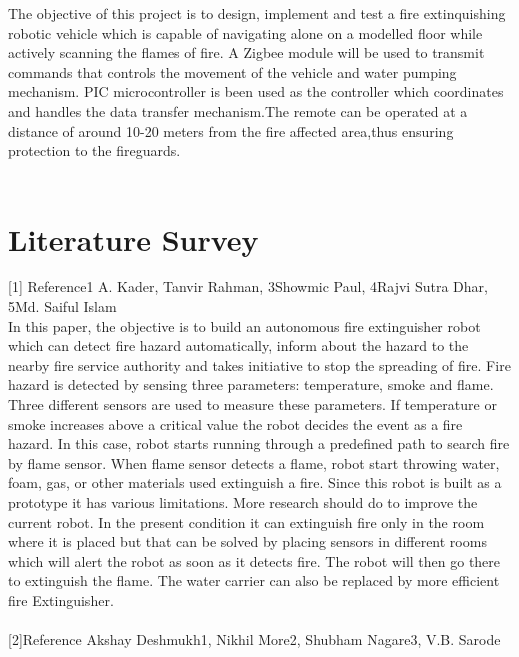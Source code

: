 \documentclass[12pt,a4paper]{report}
\begin{document}
\hspace*{1cm}
The objective of this project is to design, implement and test a fire extinquishing robotic vehicle which is capable of navigating alone on a modelled floor while actively scanning the flames of fire.
A Zigbee module will be used to transmit commands that controls the movement of the vehicle and water pumping mechanism.
PIC microcontroller is been used as the controller which coordinates and handles the data transfer mechanism.The remote can be operated at a distance of around 10-20 meters from the fire affected area,thus ensuring protection to the fireguards. \\\
\section{Literature Survey}
\hspace*{1cm} [1] Reference1 A. Kader,  Tanvir Rahman, 3Showmic Paul, 4Rajvi Sutra Dhar, 5Md. Saiful Islam 
\\In this paper, the objective is to build an autonomous fire extinguisher robot which can detect fire hazard automatically, inform about the hazard to the nearby fire service authority and takes initiative to stop the spreading of fire. Fire hazard is detected by sensing three parameters: temperature, smoke and flame. Three different sensors are used to measure these parameters. If temperature or smoke increases above a critical value the robot decides the event as a fire hazard. In this case, robot starts running through a predefined path to search fire by flame sensor. When flame sensor detects a flame, robot start throwing water, foam, gas, or other materials used extinguish a fire. Since this robot is built as a prototype it has various limitations. More research should do to improve the current robot. In the present condition it can extinguish fire only in the room where it is placed but that can be solved by placing sensors in different rooms which will alert the robot as soon as it detects fire. The robot will then go there to extinguish the flame. The water carrier can also be replaced by more efficient fire Extinguisher. \\\\ 
 \hspace*{1cm}[2]Reference Akshay Deshmukh1, Nikhil More2, Shubham Nagare3, V.B. Sarode
\end{document}
